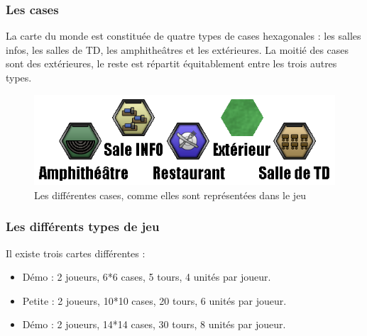 \subsubsection{Les cases}
La carte du monde est constituée de quatre types de cases hexagonales : les salles infos, les salles de TD, les amphitheâtres et les extérieures.
La moitié des cases sont des extérieures, le reste est répartit équitablement entre les trois autres types.

\begin{figure}[!h]
\centering
\includegraphics[width=.7\textwidth]{Parties/Images/Terrains.png}
\caption{Les différentes cases, comme elles sont représentées dans le jeu}
\label{fig:Terrains}
\end{figure}

\subsubsection{Les différents types de jeu}
Il existe trois cartes différentes :
\begin{itemize}
\item Démo : 2 joueurs, 6*6 cases, 5 tours, 4 unités par joueur.
\item Petite : 2 joueurs, 10*10 cases, 20 tours, 6 unités par joueur.
\item Démo : 2 joueurs, 14*14 cases, 30 tours, 8 unités par joueur.
\end{itemize}